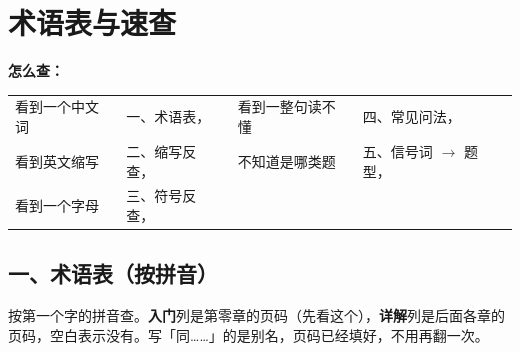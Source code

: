 \chapter*{术语表与速查}\label{ch:glossary}
\providecommand{\sgrp}[1]{\multicolumn{4}{@{}l}{\rule{0pt}{14pt}\sffamily\bfseries【#1】}\\*}

\noindent\textbf{怎么查：}
\begin{center}\small\renewcommand{\arraystretch}{1.25}
\begin{tabular}{@{}ll@{\qquad}ll@{}}
看到一个中文词 & 一、术语表，\pageref{tab:glossary} & 看到一整句读不懂 & 四、常见问法，\pageref{tab:phrases}\\
看到英文缩写 & 二、缩写反查，\pageref{tab:abbr} & 不知道是哪类题 & 五、信号词 $\to$ 题型，\pageref{tab:signal}\\
看到一个字母 & 三、符号反查，\pageref{tab:symbols} & & \\
\end{tabular}
\end{center}

\section*{一、术语表（按拼音）}\label{tab:glossary}
\noindent 按第一个字的拼音查。\textbf{入门}列是第零章的页码（先看这个），\textbf{详解}列是后面各章的页码，空白表示没有。写「同……」的是别名，页码已经填好，不用再翻一次。

\smallskip
{}

